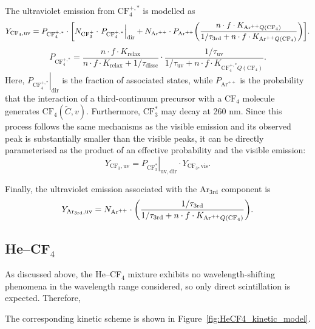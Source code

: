 \documentclass[12pt,a4paper]{article}
\newcommand{\Ar}{\mathrm{Ar}}
\newcommand{\CF}{\mathrm{CF}}
\newcommand{\vis}{\mathrm{vis}}
\newcommand{\uv}{\mathrm{uv}}
\newcommand{\third}{\mathrm{3rd}}
\newcommand{\dir}{\mathrm{dir}}
\begin{document}
The ultraviolet emission from $\CF_4^{+,*}$ is modelled as
\begin{equation}
    Y_{\CF_4,\uv}
    =
    P_{\CF_4^{+,*}}
    \cdot
    \bqty{
      N_{\CF_3^+}\cdot \left. P_{\CF_4^{+,*}} \right|_{\dir}
      +
      N_{\Ar^{++}}\cdot P_{\Ar^{++}}
      \pqty{
        \frac{n \cdot f \cdot K_{\Ar^{++}Q(\CF_4)}}{
        1/\tau_{\third} + n \cdot f \cdot K_{\Ar^{++}Q(\CF_4)}}
      }
    }. \label{eq:YuvCF4}
\end{equation}
\begin{equation}
    P_{\CF_4^{+,*}}
    =
    \frac{n \cdot f \cdot K_{\text{relax}}}{
    n \cdot f \cdot K_{\text{relax}} + 1/\tau_{\text{dissc}}}
    \cdot
    \frac{1/\tau_{\uv}}{
    1/\tau_{\uv} + n \cdot f \cdot K_{\CF_4^{+,*}Q(\CF_4)}}.
\end{equation}
Here, $\left. P_{\CF_4^{+,*}} \right|_{\dir}$ is the fraction of associated states, while $P_{\Ar^{++}}$ is the probability that the interaction of a third-continuum precursor with a $\CF_4$ molecule generates $\CF_4(\tilde{C},v)$. Furthermore, $\CF_3^*$ may decay at 260 nm. Since this process follows the same mechanisms as the visible emission and its observed peak is substantially smaller than the visible peaks, it can be directly parameterised as the product of an effective probability and the visible emission:
\begin{equation}
    Y_{\CF_3,\uv}
    = \left. P_{\CF_3^*}\right|_{\uv,\dir} \cdot
    Y_{\CF_3,\vis}.     \label{eq:YuvCF3}
\end{equation}

Finally, the ultraviolet emission associated with the $\Ar_{\third}$ component is
\begin{equation}
    Y_{\Ar_{\third},\uv}
    =
    N_{\Ar^{++}}
    \cdot
    \pqty{
      \frac{1/\tau_{\third}}{
      1/\tau_{\third} + n \cdot f \cdot K_{\Ar^{++}Q(\CF_4)}}
    }. \label{eq:YuvAr3rd}
\end{equation}

\subsection{He--CF$_4$} \label{subbsec:kinHeCF4}

As discussed above, the He--CF$_4$ mixture exhibits no wavelength-shifting phenomena in the wavelength range considered, so only direct scintillation is expected. Therefore,

The corresponding kinetic scheme is shown in Figure~\ref{fig:HeCF4_kinetic_model}.
\end{document}
